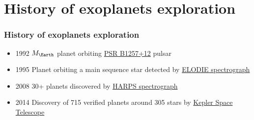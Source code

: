 \documentclass{beamer}
\begin{document}
\section{History of exoplanets exploration}
\begin{frame}
\frametitle{History of exoplanets exploration}
\begin{itemize}
\item 1992 $M_\Earth$ planet orbiting \href{https://en.wikipedia.org/wiki/PSR_B1257\%2B12}{PSR B1257+12} pulsar
\item 1995 Planet orbiting a main sequence star detected by
      \href{http://www.obs-hp.fr/guide/elodie/elodie-eng.html}{ELODIE spectrograph}
\item 2008 30+ planets discovered by \href{http://www.eso.org/sci/facilities/lasilla/instruments/harps.html}{HARPS spectrograph}
\item 2014 Discovery of 715 verified planets around 305 stars by %
      \href{http://www.nasa.gov/mission_pages/kepler/main/index.html}{Kepler Space Telescope}
\end{itemize}
\end{frame}
\end{document}
